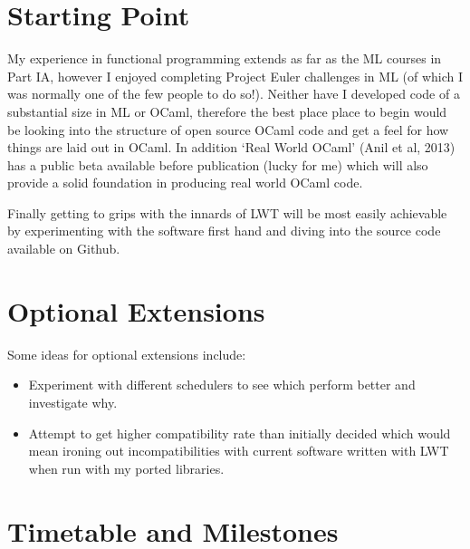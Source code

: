 \documentclass[a4paper]{article}
\begin{document}
\section{Starting Point}
\label{sec:starting}
My experience in functional programming extends as far as the ML courses in Part IA, however I enjoyed completing Project Euler challenges in ML (of which I was normally one of the few people to do so!). Neither have I developed code of a substantial size in ML or OCaml, therefore the best place place to begin would be looking into the structure of open source OCaml code and get a feel for how things are laid out in OCaml. In addition `Real World OCaml' (Anil et al, 2013) has a public beta available before publication (lucky for me) which will also provide a solid foundation in producing real world OCaml code.

Finally getting to grips with the innards of LWT will be most easily achievable by experimenting with the software first hand and diving into the source code available on Github.

\section{Optional Extensions}
\label{sec:optional}
Some ideas for optional extensions include:
\begin{itemize}
\item{Experiment with different schedulers to see which perform better and investigate why.}
\item{Attempt to get higher compatibility rate than initially decided which would mean ironing out incompatibilities with current software written with LWT when run with my ported libraries.}
\end{itemize}

\section{Timetable and Milestones}
\label{sec:timetable}
\end{document}
